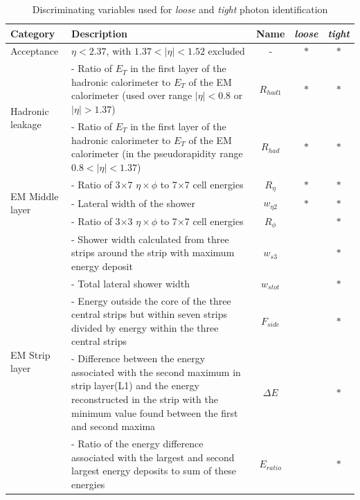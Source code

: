 \documentclass[a4paper, oneside, 11pt, openright]{book}
\begin{document}
			\begin{center}
				\small
				\begin{table}[h!]
					\centering
					\begin{tabular}{lp{6cm}ccc}
						\toprule[1.5pt]
						\textbf{Category} & \textbf{Description} & \textbf{Name} & \textbf{\textit{loose}} & \textbf{\textit{tight}}\\
						\midrule
						Acceptance & $\eta<2.37$, with $1.37<|\eta|<1.52$ excluded & - & $\ast$ & $\ast$ \\
						\midrule
						\multirow[t]{2}{*}{Hadronic leakage} 
						& {- Ratio of $E_T$ in the first layer of the hadronic calorimeter to $E_T$ of the EM calorimeter (used over range $|\eta| < 0.8$ or $|\eta| > 1.37$)} & $R_{had1}$ & $\ast$ & $\ast$  \\ 
						& - Ratio of $E_T$ in the first layer of the hadronic calorimeter to $E_T$ of the EM calorimeter (in the pseudorapidity range $0.8 < |\eta| < 1.37$) & $R_{had}$  & $\ast$ & $\ast$ \\
						\midrule
						\multirow[t]{3}{*}{EM Middle layer}
						& - Ratio of 3$\times$7 $\eta\times\phi$ to 7$\times$7 cell energies & $R_{\eta}$ & $\ast$ & $\ast$ \\
						& - Lateral width of the shower & $w_{\eta2}$ & $\ast$ & $\ast$ \\
						& - Ratio of 3$\times$3 $\eta\times\phi$ to 7$\times$7 cell energies & $R_{\phi}$ &  & $\ast$ \\
						\midrule
						\multirow[t]{5}{*}{EM Strip layer}
						& - Shower width calculated from three strips around the strip with maximum energy deposit & $w_{s3}$ &  & $\ast$ \\
						& - Total lateral shower width & $w_{stot}$ &  & $\ast$ \\
						& - Energy outside the core of the three central strips but within seven strips divided by energy within the three central strips & $F_{side}$ &  & $\ast$ \\
						& - Difference between the energy associated with the second maximum in strip layer(L1) and the energy reconstructed in the strip with the minimum value found between the first and second maxima & $\Delta E$ &  & $\ast$ \\
						& - Ratio of the energy difference associated with the largest and second largest energy deposits to sum of these energies & $E_{ratio}$ &  & $\ast$ \\
						\bottomrule
					\end{tabular}
					\caption{Discriminating variables used for \textit{loose} and \textit{tight} photon identification \cite{Identification}}
					\label{tab:ph parameters}
				\end{table}
			\end{center}
		
\end{document}
